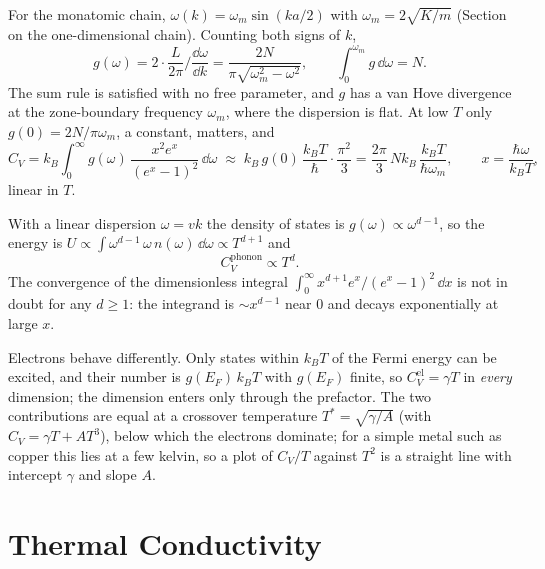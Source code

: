 \begin{example}
For the monatomic chain, $\omega(k)=\omega_m\sin(ka/2)$ with $\omega_m = 2\sqrt{K/m}$ (Section on the one-dimensional chain). Counting both signs of $k$,
\begin{equation}
    g(\omega) = 2\cdot\frac{L}{2\pi}\Big/\frac{\dd\omega}{\dd k} = \frac{2N}{\pi\sqrt{\omega_m^2-\omega^2}},
    \qquad \int_0^{\omega_m} g\,\dd\omega = N.
\end{equation}
The sum rule is satisfied with no free parameter, and $g$ has a van Hove divergence at the zone-boundary frequency $\omega_m$, where the dispersion is flat. At low $T$ only $g(0)=2N/\pi\omega_m$, a constant, matters, and
\begin{equation}
    C_V = k_B\int_0^\infty g(\omega)\,\frac{x^2e^x}{(e^x-1)^2}\,\dd\omega
    \;\approx\; k_B\,g(0)\,\frac{k_BT}{\hbar}\cdot\frac{\pi^2}{3}
    = \frac{2\pi}{3}\,Nk_B\,\frac{k_BT}{\hbar\omega_m},
    \qquad x=\frac{\hbar\omega}{k_BT},
\end{equation}
linear in $T$.
\end{example}

\begin{fact}
With a linear dispersion $\omega=vk$ the density of states is $g(\omega)\propto\omega^{d-1}$, so the energy is $U\propto\int\omega^{d-1}\,\omega\,n(\omega)\,\dd\omega\propto T^{d+1}$ and
\begin{equation}
    C_V^{\text{phonon}}\propto T^{d}.
\end{equation}
The convergence of the dimensionless integral $\int_0^\infty x^{d+1}e^x/(e^x-1)^2\,\dd x$ is not in doubt for any $d\ge1$: the integrand is $\sim x^{d-1}$ near $0$ and decays exponentially at large $x$.
\end{fact}

Electrons behave differently. Only states within $k_BT$ of the Fermi energy can be excited, and their number is $g(E_F)\,k_BT$ with $g(E_F)$ finite, so $C_V^{\text{el}}=\gamma T$ in \emph{every} dimension; the dimension enters only through the prefactor. The two contributions are equal at a crossover temperature $T^\ast=\sqrt{\gamma/A}$ (with $C_V=\gamma T+AT^3$), below which the electrons dominate; for a simple metal such as copper this lies at a few kelvin, so a plot of $C_V/T$ against $T^2$ is a straight line with intercept $\gamma$ and slope $A$.

\section{Thermal Conductivity}

